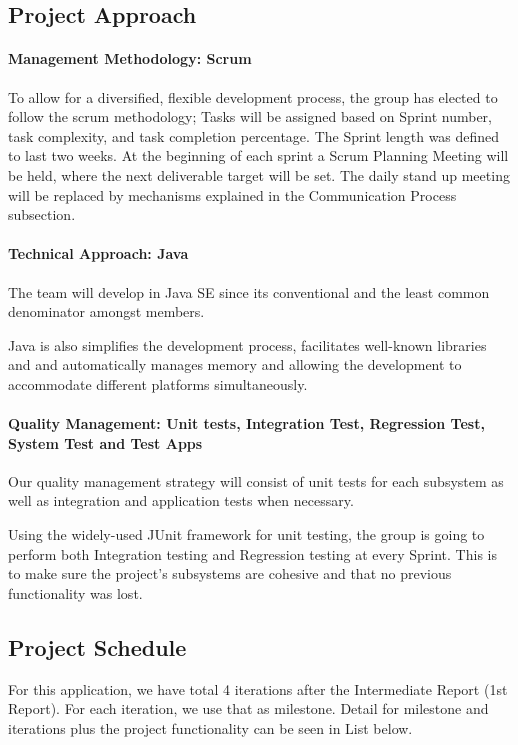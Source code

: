\documentclass[11pt]{article}
\begin{document}
\subsection{Project Approach}
	\paragraph{Management Methodology: Scrum}
	To allow for a diversified, flexible development process, the group has elected to follow the scrum methodology; Tasks will be assigned based on Sprint number, task complexity, and task completion percentage.
	The Sprint length was defined to last two weeks. At the beginning of each sprint a Scrum Planning Meeting will be held, where the next deliverable target will be set. The daily stand up meeting will be replaced by mechanisms explained in the Communication Process subsection.
	
	\paragraph{Technical Approach: Java} The team will develop in Java SE since its conventional and the least common denominator amongst members. 
	
	 Java is also simplifies the development process, facilitates well-known libraries and and automatically manages memory and allowing the development to accommodate different platforms simultaneously. 

	\paragraph{Quality Management: Unit tests, Integration Test, Regression Test, System Test and Test Apps}
	Our quality management strategy will consist of unit tests for each subsystem as well as integration and application tests when necessary.  
		
	Using the widely-used JUnit framework for unit testing, the group is going to perform both Integration testing and Regression testing at every Sprint. This is to make sure the project's subsystems are cohesive and that no previous functionality was lost.
		
		
\subsection{Project Schedule}

 For this application, we have total 4 iterations after the Intermediate Report (1st Report). For each iteration, we use that as milestone. Detail for milestone and iterations plus the project functionality can be seen in List below.
\end{document}
